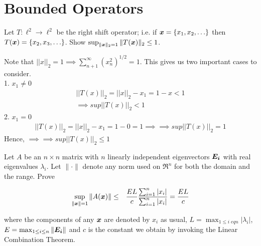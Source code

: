 \documentclass[11pt]{SelfArxOneColBMN}
\begin{document}
\section{Bounded Operators}

\begin{exercise}
Let $T : \ell^2 \rightarrow \ell^2$ be the right shift operator; i.e. if $\boldsymbol{x} = \{x_1, x_2, \ldots \}$
then $T(\boldsymbol{x}) = \{x_2, x_3, \ldots \}$.  Show $\sup_{\|\boldsymbol{x}\|_2 = 1} \|T(\boldsymbol{x})\|_2 \leq 1$.
\end{exercise}

\begin{solution}
  Note that $||x||_2 = 1 \implies \sum_{n+1}^\infty(x_n^2)^{1/2} = 1$. This gives us two important cases to consider.\\
  1. $x_1 \neq 0$\\
  \begin{eqnarray*}
    ||T(x)||_2 = ||x||_2 - x_1 = 1 - x < 1\\
    \implies sup||T(x)||_2 < 1
  \end{eqnarray*} 
  2. $x_1 = 0$
  \begin{eqnarray*}
    ||T(x)||_2 = ||x||_2 - x_1 = 1 - 0 = 1
    \implies \implies sup||T(x)||_2 = 1
  \end{eqnarray*}
  Hence, $\implies \implies sup||T(x)||_2 \leq 1$
\end{solution}

\begin{exercise}
Let $A$ be an $n \times n$ matrix with $n$ linearly independent
eigenvectors $\boldsymbol{E_i}$ with real eigenvalues $\lambda_i$.  Let
$\| \cdot \|$ denote any norm used on $\Re^n$ for both the domain and
the range. Prove

\begin{eqnarray*} \sup_{\|\boldsymbol{x}\| = 1} \|A(\boldsymbol{x})\|
&\leq& \frac{EL}{c} \frac{\sum_{i=1}^n |x_i|}{\sum_{i=1}^n |x_i|} =
\frac{EL}{c}
\end{eqnarray*}

\noindent
where the components of any $\boldsymbol{x}$ are denoted by $x_i$ as usual, $L
= \max_{1 \leq i \;eq n} |\lambda_i|$, $E = \max_{1 \leq i \leq n}
\|\boldsymbol{E_i}\|$ and $c$ is the constant we obtain by invoking the Linear
Combination Theorem.
\end{exercise}
\end{document}
